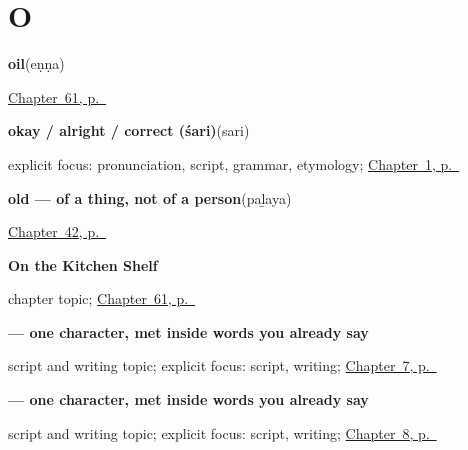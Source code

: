 \section*{O}

\noindent\begin{minipage}[t]{\linewidth}
\raggedright
\textbf{oil}\enspace\emph{}\enspace(eṇṇa)\par
\footnotesize \hyperref[ch:ml-on-the-kitchen-shelf]{Chapter~61, p.~\pageref*{ch:ml-on-the-kitchen-shelf}}
\end{minipage}\par\smallskip

\noindent\begin{minipage}[t]{\linewidth}
\raggedright
\textbf{okay / alright / correct (śari)}\enspace\emph{}\enspace(sari)\par
\footnotesize explicit focus: pronunciation, script, grammar, etymology; \hyperref[ch:greetings]{Chapter~1, p.~\pageref*{ch:greetings}}
\end{minipage}\par\smallskip

\noindent\begin{minipage}[t]{\linewidth}
\raggedright
\textbf{old — of a thing, not of a person}\enspace\emph{}\enspace(paḻaya)\par
\footnotesize \hyperref[ch:ml-describing-things]{Chapter~42, p.~\pageref*{ch:ml-describing-things}}
\end{minipage}\par\smallskip

\noindent\begin{minipage}[t]{\linewidth}
\raggedright
\textbf{On the Kitchen Shelf}\par
\footnotesize chapter topic; \hyperref[ch:ml-on-the-kitchen-shelf]{Chapter~61, p.~\pageref*{ch:ml-on-the-kitchen-shelf}}
\end{minipage}\par\smallskip

\noindent\begin{minipage}[t]{\linewidth}
\raggedright
\textbf{ — one character, met inside words you already say}\par
\footnotesize script and writing topic; explicit focus: script, writing; \hyperref[ch:ml-numbers-one-to-ten]{Chapter~7, p.~\pageref*{ch:ml-numbers-one-to-ten}}
\end{minipage}\par\smallskip

\noindent\begin{minipage}[t]{\linewidth}
\raggedright
\textbf{ — one character, met inside words you already say}\par
\footnotesize script and writing topic; explicit focus: script, writing; \hyperref[ch:ml-please]{Chapter~8, p.~\pageref*{ch:ml-please}}
\end{minipage}\par\smallskip

